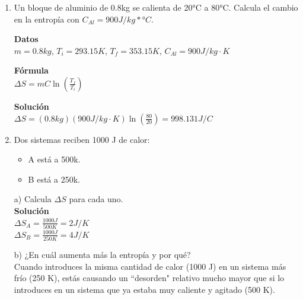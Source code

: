 \documentclass[a4paper, 11pt]{article}
\newcommand{\Pspace}{0.5cm}
\newcommand{\Aspace}{0.2cm}
\begin{document}
\begin{enumerate}
    \vspace{\Pspace}
    \item Un bloque de aluminio de 0.8kg se calienta de 20°C a 80°C. Calcula el cambio en la entropía con $C_{Al} = 900 J/kg * °C$. \par
        \vspace{\Aspace} \par
        { \color{azul} 
            \textbf{Datos} \\
            $m = 0.8kg$, $T_i = 293.15K$, $T_f = 353.15K$, $C_{Al} = 900 J/kg \cdot K$ \par

            \textbf{Fórmula} \\
            $\Delta S = m C \ln \left( \frac{T_f}{T_i} \right)$ \par

            \textbf{Solución} \\
            $\Delta S = (0.8 kg)(900 J/kg \cdot K) \ln \left( \frac{80}{20} \right) = 998.131 J/C$
        }



    \vspace{\Pspace}
    \item Dos sistemas reciben 1000 J de calor:
    \begin{itemize}
        \item A está a 500k.
        \item B está a 250k.
    \end{itemize}
        \vspace{\Aspace} \par
        a) Calcula $\Delta S$ para cada uno.
        \\ { \color{azul} 
            \textbf{Solución} \\
            $\Delta S_A = \frac{1000 J}{500 K} = 2 J/K$ \\
            $\Delta S_B = \frac{1000 J}{250 K} = 4 J/K$
        }

        \vspace{\Aspace} \par
        b) ¿En cuál aumenta más la entropía y por qué?
        \\ { \color{azul} 
            Cuando introduces la misma cantidad de calor (1000 J) en un sistema más frío (250 K), estás causando un ``desorden" relativo mucho mayor que si lo introduces en un sistema que ya estaba muy caliente y agitado (500 K).
        }
    \end{enumerate}
\end{document}

